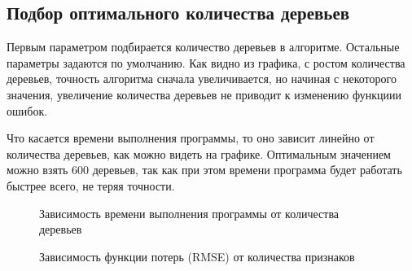 \documentclass[oneside,final,12pt]{article}
\begin{document}
\subsection {Подбор оптимального количества деревьев}
	Первым параметром подбирается количество деревьев в алгоритме. Остальные параметры задаются по умолчанию. Как видно из графика, с ростом количества деревьев, точность алгоритма сначала увеличивается, но начиная с некоторого значения, увеличение количества деревьев не приводит к изменению функциии ошибок. 

Что касается времени выполнения программы, то оно зависит линейно от количества деревьев, как можно видеть на графике. Оптимальным значением можно взять 600 деревьев, так как при этом времени программа будет работать быстрее всего, не теряя точности.
\begin{figure}[h!]
\caption{Зависимость времени выполнения программы от количества деревьев}
\label{fig:image2}
\end{figure}
\begin{figure}[h!]
\caption{Зависимость функции потерь (RMSE) от количества признаков}
\label{fig:image3}
\end{figure}
\end{document}
